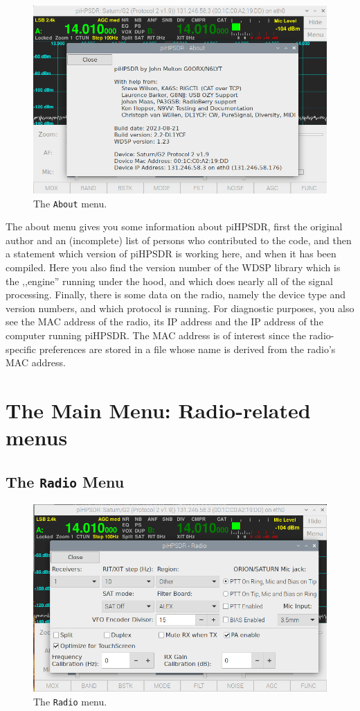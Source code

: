 \documentclass[12pt]{book}
\def\bltt#1{\texttt{\color{blue}#1}}
\begin{document}
\begin{figure}[h]
\center
\includegraphics[width=12cm]{AboutMenu.png}
\caption{The \bltt{About} menu.}
\end{figure}

The about menu gives you some information about piHPSDR, first the original author
and an (incomplete) list
of persons who contributed to the code, and then a statement which version of piHPSDR
is working here, and when it has been compiled. Here you also find the version number of the WDSP
 library which is the ,,engine''
running under the hood, and which does nearly all of the signal processing. Finally, there is
some data on the radio, namely the device type and version numbers, and which protocol is running.
For diagnostic purposes, you also see the MAC address of the radio, its IP address and the
IP address of the computer running piHPSDR. The MAC address is of interest since the radio-specific
preferences are stored in a file whose name is derived from the radio's MAC address.

\chapter{The Main Menu: Radio-related menus}
\section{The \texttt{Radio} Menu}

\begin{figure}[h]
\center
\includegraphics[width=12cm]{RadioMenu.png}
\caption{The \bltt{Radio} menu.}
\label{fig:RadioMenu}
\end{figure}
\end{document}
